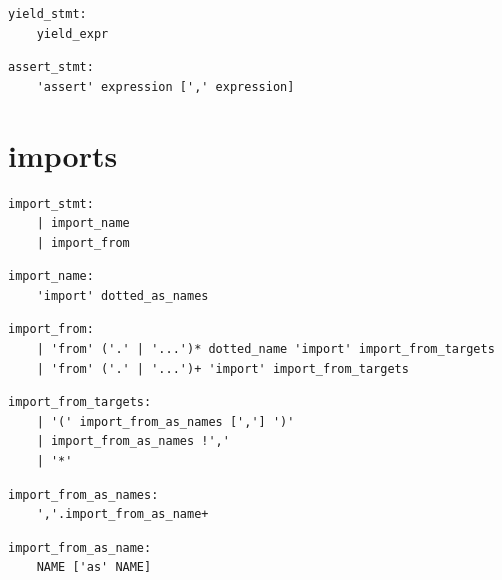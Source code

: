 \noindent\textbf{\texttt{}}\par
\begin{lstlisting}
yield_stmt:
    yield_expr
\end{lstlisting}

\noindent\textbf{\texttt{}}\par
\begin{lstlisting}
assert_stmt:
    'assert' expression [',' expression]
\end{lstlisting}

\section{imports}

\noindent\textbf{\texttt{}}\par
\begin{lstlisting}
import_stmt:
    | import_name
    | import_from
\end{lstlisting}

\noindent\textbf{\texttt{}}\par
\begin{lstlisting}
import_name:
    'import' dotted_as_names
\end{lstlisting}

\noindent\textbf{\texttt{}}\par
\begin{lstlisting}
import_from:
    | 'from' ('.' | '...')* dotted_name 'import' import_from_targets
    | 'from' ('.' | '...')+ 'import' import_from_targets
\end{lstlisting}

\noindent\textbf{\texttt{}}\par
\begin{lstlisting}
import_from_targets:
    | '(' import_from_as_names [','] ')'
    | import_from_as_names !','
    | '*'
\end{lstlisting}

\noindent\textbf{\texttt{}}\par
\begin{lstlisting}
import_from_as_names:
    ','.import_from_as_name+
\end{lstlisting}

\noindent\textbf{\texttt{}}\par
\begin{lstlisting}
import_from_as_name:
    NAME ['as' NAME]
\end{lstlisting}

